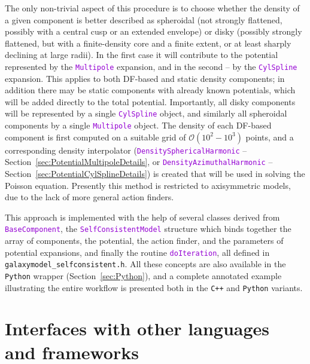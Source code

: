 \documentclass[12pt]{article}
\newcommand{\Cpp}  {\texttt{C++}\xspace}
\newcommand{\Python}{\texttt{Python}\xspace}
\newcommand{\ttt}[1]{\textcolor{darkviolet}{\texttt{#1}}}
\begin{document}
The only non-trivial aspect of this procedure is to choose whether the density of a given component is better described as spheroidal (not strongly flattened, possibly with a central cusp or an extended envelope) or disky (possibly strongly flattened, but with a finite-density core and a finite extent, or at least sharply declining at large radii). In the first case it will contribute to the potential represented by the \ttt{Multipole} expansion, and in the second -- by the \ttt{CylSpline} expansion. This applies to both DF-based and static density components; in addition there may be static components with already known potentials, which will be added directly to the total potential. Importantly, all disky components will be represented by a single \ttt{CylSpline} object, and similarly all spheroidal components by a single \ttt{Multipole} object.
The density of each DF-based component is first computed on a suitable grid of $\mathcal{O}(10^2-10^3)$ points, and a corresponding density interpolator (\ttt{DensitySphericalHarmonic} -- Section~\ref{sec:PotentialMultipoleDetails}, or \ttt{DensityAzimuthalHarmonic} -- Section~\ref{sec:PotentialCylSplineDetails}) is created that will be used in solving the Poisson equation. 
Presently this method is restricted to axisymmetric models, due to the lack of more general action finders.

This approach is implemented with the help of several classes derived from \ttt{BaseComponent}, the \ttt{SelfConsistentModel} structure which binds together the array of components, the potential, the action finder, and the parameters of potential expansions, and finally the routine \ttt{doIteration}, all defined in \texttt{galaxymodel_selfconsistent.h}. All these concepts are also available in the \Python wrapper (Section~\ref{sec:Python}), and a complete annotated example illustrating the entire workflow is presented both in the \Cpp and \Python variants.


\section{Interfaces with other languages and frameworks}  \label{sec:Interfaces}
\end{document}
